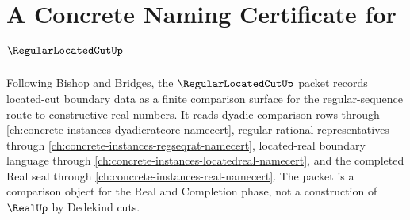 \chapter{A Concrete Naming Certificate for $\RegularLocatedCutUp$}
\label{ch:concrete-instances-regular-located-cut-namecert}

Following Bishop and Bridges, the $\RegularLocatedCutUp$ packet records located-cut boundary data as a finite comparison surface for the regular-sequence route to constructive real numbers. It reads dyadic comparison rows through \autoref{ch:concrete-instances-dyadicratcore-namecert}, regular rational representatives through \autoref{ch:concrete-instances-regseqrat-namecert}, located-real boundary language through \autoref{ch:concrete-instances-locatedreal-namecert}, and the completed Real seal through \autoref{ch:concrete-instances-real-namecert}. The packet is a comparison object for the Real and Completion phase, not a construction of $\RealUp$ by Dedekind cuts.



